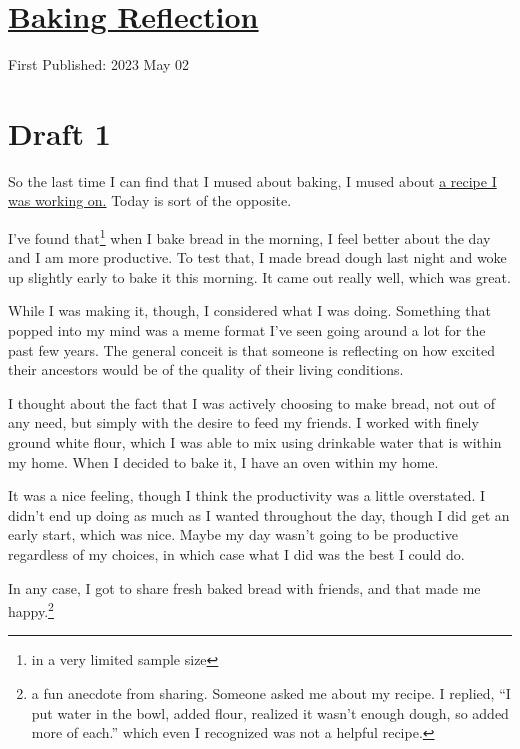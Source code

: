 \documentclass[12pt]{article}[titlepage]
\newcommand{\say}[1]{``#1''}
\newcommand{\1}{\={a}}
\newcommand{\2}{\={e}}
\newcommand{\3}{\={\i}}
\newcommand{\4}{\=o}
\newcommand{\5}{\=u}
\newcommand{\6}{\={A}}
\renewcommand{\,}{\textsuperscript{,}}
\begin{document}
\doublespacing
\section{\href{baking-reflection.html}{Baking Reflection}}
First Published: 2023 May 02
\section{Draft 1}
So the last time I can find that I mused about baking, I mused about \href{baking-take-four.html}{a recipe I was working on.}
Today is sort of the opposite.

I've found that\footnote{in a very limited sample size} when I bake bread in the morning, I feel better about the day and I am more productive.
To test that, I made bread dough last night and woke up slightly early to bake it this morning.
It came out really well, which was great.

While I was making it, though, I considered what I was doing.
Something that popped into my mind was a meme format I've seen going around a lot for the past few years.
The general conceit is that someone is reflecting on how excited their ancestors would be of the quality of their living conditions.

I thought about the fact that I was actively choosing to make bread, not out of any need, but simply with the desire to feed my friends.
I worked with finely ground white flour, which I was able to mix using drinkable water that is within my home.
When I decided to bake it, I have an oven within my home.

It was a nice feeling, though I think the productivity was a little overstated.
I didn't end up doing as much as I wanted throughout the day, though I did get an early start, which was nice.
Maybe my day wasn't going to be productive regardless of my choices, in which case what I did was the best I could do.

In any case, I got to share fresh baked bread with friends, and that made me happy.\footnote{a fun anecdote from sharing. Someone asked me about my recipe. I replied, \say{I put water in the bowl, added flour, realized it wasn't enough dough, so added more of each.} which even I recognized was not a helpful recipe.}
\end{document}

